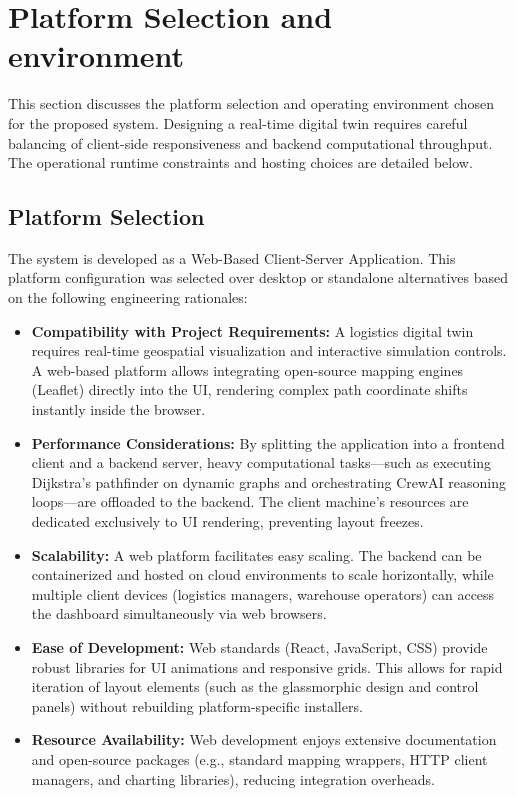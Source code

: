 \section[Platform Selection and environment]{Platform Selection and environment}
This section discusses the platform selection and operating environment chosen for the proposed system. Designing a real-time digital twin requires careful balancing of client-side responsiveness and backend computational throughput. The operational runtime constraints and hosting choices are detailed below.
\subsection[Platform Selection]{Platform Selection}
The system is developed as a Web-Based Client-Server Application. This platform configuration was selected over desktop or standalone alternatives based on the following engineering rationales:

\begin{itemize}
    \item \textbf{Compatibility with Project Requirements:} A logistics digital twin requires real-time geospatial visualization and interactive simulation controls. A web-based platform allows integrating open-source mapping engines (Leaflet) directly into the UI, rendering complex path coordinate shifts instantly inside the browser.
    \item \textbf{Performance Considerations:} By splitting the application into a frontend client and a backend server, heavy computational tasks—such as executing Dijkstra’s pathfinder on dynamic graphs and orchestrating CrewAI reasoning loops—are offloaded to the backend. The client machine's resources are dedicated exclusively to UI rendering, preventing layout freezes.
    \item \textbf{Scalability:} A web platform facilitates easy scaling. The backend can be containerized and hosted on cloud environments to scale horizontally, while multiple client devices (logistics managers, warehouse operators) can access the dashboard simultaneously via web browsers.
    \item \textbf{Ease of Development:} Web standards (React, JavaScript, CSS) provide robust libraries for UI animations and responsive grids. This allows for rapid iteration of layout elements (such as the glassmorphic design and control panels) without rebuilding platform-specific installers.
    \item \textbf{Resource Availability:} Web development enjoys extensive documentation and open-source packages (e.g., standard mapping wrappers, HTTP client managers, and charting libraries), reducing integration overheads.
\end{itemize}

